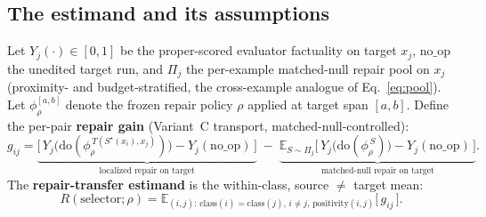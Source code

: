 \documentclass[11pt]{article}
\theoremstyle{plain}
\theoremstyle{definition}
\newcommand{\Pij}{\Pi_j}
\newcommand{\Eop}{\mathbb{E}}
\newcommand{\noop}{\mathrm{no\_op}}
\newcommand{\policy}{\rho}
\newcommand{\Sstar}{S^{\star}}
\begin{document}
\subsection{The estimand and its assumptions}\label{sec:method:assump}

Let $Y_j(\cdot)\in[0,1]$ be the proper-scored evaluator factuality on target $x_j$,
$\noop$ the unedited target run, and $\Pij$ the per-example matched-null repair pool
on $x_j$ (proximity- and budget-stratified, the cross-example analogue of
Eq.~\ref{eq:pool}). Let $\phi_\policy^{[a,b]}$ denote the frozen repair policy
$\policy$ applied at target span $[a,b]$. Define the per-pair \textbf{repair gain}
(Variant~C transport, matched-null-controlled):
\begin{equation}
g_{ij} = \underbrace{\Big[\,Y_j\big(\mathrm{do}(\phi_\policy^{\,T(\Sstar(x_i),x_j)})\big) - Y_j(\noop)\,\Big]}_{\text{localized repair on target}}
\;-\;
\underbrace{\Eop_{S\sim\Pij}\Big[\,Y_j\big(\mathrm{do}(\phi_\policy^{\,S})\big) - Y_j(\noop)\,\Big]}_{\text{matched-null repair on target}}.
\label{eq:gij}
\end{equation}
The \textbf{repair-transfer estimand} is the within-class, source $\ne$ target mean:
\begin{equation}
R(\text{selector};\policy) = \Eop_{(i,j):\,\mathrm{class}(i)=\mathrm{class}(j),\, i\ne j,\, \mathrm{positivity}(i,j)}\big[\,g_{ij}\,\big].
\label{eq:R}
\end{equation}
\end{document}
